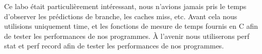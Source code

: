 \documentclass[
	a4paper, %
	10pt, %
]{CSUniSchoolLabReport}
\begin{document}
Ce labo était particulièrement intéressant, nous n'avions jamais pris le temps d'observer les prédictions de branche, les caches miss, etc.
Avant cela nous utilisions uniquement time, et les fonctions de mesure de temps fournis en C afin de tester les performances de nos programmes.
À l'avenir nous utiliserons perf stat et perf record afin de tester les performances de nos programmes.



\printbibliography %

\end{document}
